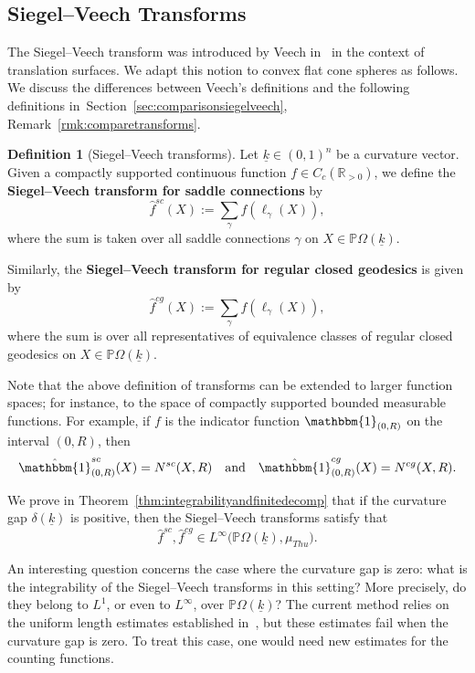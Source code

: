 \documentclass{compositio}
\numberwithin{equation}{section}
\numberwithin{figure}{section}
\theoremstyle{definition}
\newtheorem{definition}{Definition}[section]
\theoremstyle{plain}
\begin{document}
{\subsection{Siegel--Veech Transforms}
The Siegel--Veech transform was introduced by Veech in~\cite{Veech} in the context of translation surfaces. We adapt this notion to convex flat cone spheres as follows. We discuss the differences between Veech's definitions and the following definitions in~Section~\ref{sec:comparisonsiegelveech}, Remark~\ref{rmk:comparetransforms}.

\begin{definition}[Siegel--Veech transforms]\label{def:introsiegelveechtransform}
Let $\underline{k}\in(0,1)^n$ be a curvature vector. Given a compactly supported continuous function $f \in C_c(\mathbb{R}_{>0})$, we define the \textbf{Siegel--Veech transform for saddle connections} by
$$
\hat{f}^{sc}(X) := \sum_{\gamma} f(\ell_{\gamma}(X)),
$$
where the sum is taken over all saddle connections $\gamma$ on $X \in \mathbb{P}\Omega(\underline{k})$.

Similarly, the \textbf{Siegel--Veech transform for regular closed geodesics} is given by
$$
\hat{f}^{cg}(X) := \sum_{\gamma} f(\ell_{\gamma}(X)),
$$
where the sum is over all representatives of equivalence classes of regular closed geodesics on $X \in \mathbb{P}\Omega(\underline{k})$.
\end{definition}

Note that the above definition of transforms can be extended to larger function spaces; for instance, to the space of compactly supported bounded measurable functions. For example, if $f$ is the indicator function $\mathbbm{1}_{(0,R)}$ on the interval $(0, R)$, then
$$
\hat{\mathbbm{1}}^{sc}_{(0,R)}(X) = N^{sc}(X, R) \quad \text{and} \quad \hat{\mathbbm{1}}^{cg}_{(0,R)}(X) = N^{cg}(X, R).
$$

We prove in Theorem~\ref{thm:integrabilityandfinitedecomp} that if the curvature gap $\delta(\underline{k})$ is positive, then the Siegel--Veech transforms satisfy that
$$
\hat{f}^{sc}, \hat{f}^{cg} \in L^{\infty}\big(\mathbb{P}\Omega(\underline{k}), \mu_{Thu}\big).
$$

An interesting question concerns the case where the curvature gap is zero: what is the integrability of the Siegel--Veech transforms in this setting? More precisely, do they belong to $L^1$, or even to $L^\infty$, over $\mathbb{P}\Omega(\underline{k})$? The current method relies on the uniform length estimates established in~\cite{fu2023boundssaddleconnectionsflat, fu2024uniformlengthestimatestrajectories}, but these estimates fail when the curvature gap is zero. To treat this case, one would need new estimates for the counting functions.

}
\end{document}
